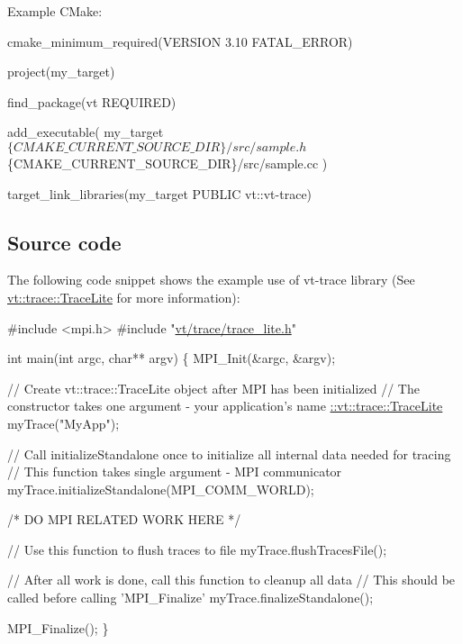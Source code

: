Example C\+Make\+: 
\begin{DoxyCode}
cmake\_minimum\_required(VERSION 3.10 FATAL\_ERROR)

project(my\_target)

find\_package(vt REQUIRED)

add\_executable(
  my\_target
  $\{CMAKE\_CURRENT\_SOURCE\_DIR\}/src/sample.h
  $\{CMAKE\_CURRENT\_SOURCE\_DIR\}/src/sample.cc
)

target\_link\_libraries(my\_target PUBLIC vt::vt-trace)
\end{DoxyCode}


\subsection*{Source code}

The following code snippet shows the example use of vt-\/trace library (See {\ttfamily \hyperlink{structvt_1_1trace_1_1_trace_lite}{vt\+::trace\+::\+Trace\+Lite}} for more information)\+:


\begin{DoxyCode}
\textcolor{preprocessor}{#include <mpi.h>}
\textcolor{preprocessor}{#include "\hyperlink{trace__lite_8h}{vt/trace/trace\_lite.h}"}

\textcolor{keywordtype}{int} main(\textcolor{keywordtype}{int} argc, \textcolor{keywordtype}{char}** argv) \{
  MPI\_Init(&argc, &argv);

  \textcolor{comment}{// Create vt::trace::TraceLite object after MPI has been initialized}
  \textcolor{comment}{// The constructor takes one argument - your application's name}
  \hyperlink{structvt_1_1trace_1_1_trace_lite}{::vt::trace::TraceLite} myTrace(\textcolor{stringliteral}{"MyApp"});


  \textcolor{comment}{// Call initializeStandalone once to initialize all internal data needed for tracing}
  \textcolor{comment}{// This function takes single argument - MPI communicator}
  myTrace.initializeStandalone(MPI\_COMM\_WORLD);

  \textcolor{comment}{/*}
\textcolor{comment}{     DO MPI RELATED WORK HERE}
\textcolor{comment}{  */}

  \textcolor{comment}{// Use this function to flush traces to file}
  myTrace.flushTracesFile();

  \textcolor{comment}{// After all work is done, call this function to cleanup all data}
  \textcolor{comment}{// This should be called before calling 'MPI\_Finalize'}
  myTrace.finalizeStandalone();

  MPI\_Finalize();
\}
\end{DoxyCode}
 